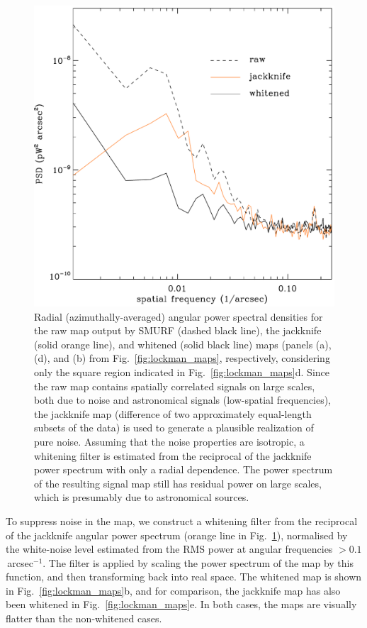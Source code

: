 \documentclass[useAMS,usenatbib,nofootinbib]{mn2e}
\begin{document}
\begin{figure}
\centering
\includegraphics[width=\linewidth]{lockman_pspec.pdf}
\caption{Radial (azimuthally-averaged) angular power spectral
  densities for the raw map output by SMURF (dashed black line), the
  jackknife (solid orange line), and whitened (solid black line) maps
  (panels (a), (d), and (b) from Fig.~\ref{fig:lockman_maps},
  respectively, considering only the square region indicated in
  Fig.~\ref{fig:lockman_maps}d. Since the raw map contains spatially
  correlated signals on large scales, both due to noise and
  astronomical signals (low-spatial frequencies), the jackknife map
  (difference of two approximately equal-length subsets of the data)
  is used to generate a plausible realization of pure noise. Assuming
  that the noise properties are isotropic, a whitening filter is
  estimated from the reciprocal of the jackknife power spectrum with
  only a radial dependence. The power spectrum of the resulting signal
  map still has residual power on large scales, which is presumably
  due to astronomical sources.}
\label{fig:lockman_pspec}
\end{figure}

To suppress noise in the map, we construct a whitening filter from the
reciprocal of the jackknife angular power spectrum (orange line in
Fig.~\ref{fig:lockman_pspec}), normalised by the white-noise level
estimated from the RMS power at angular frequencies $>
0.1$\,arcsec$^{-1}$. The filter is applied by scaling the power
spectrum of the map by this function, and then transforming back into
real space. The whitened map is shown in Fig.~\ref{fig:lockman_maps}b,
and for comparison, the jackknife map has also been whitened in
Fig.~\ref{fig:lockman_maps}e. In both cases, the maps are visually
flatter than the non-whitened cases.
\end{document}
